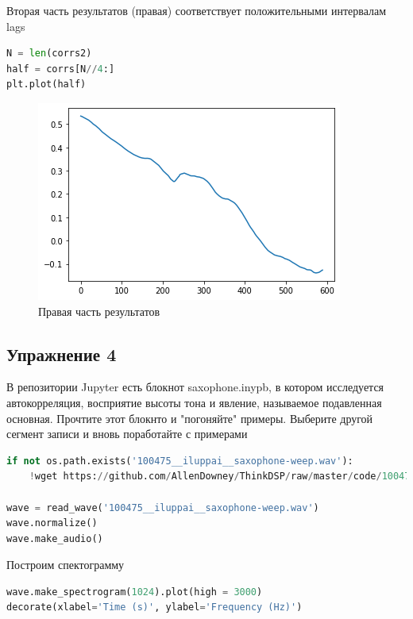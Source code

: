 Вторая часть результатов (правая) соответствует положительными интервалам lags

\begin{lstlisting}[language=Python]
N = len(corrs2)
half = corrs[N//4:]
plt.plot(half)
\end{lstlisting}

\begin{figure}[H]
	\begin{center}
		\includegraphics[scale=1]{fig/lab05/lab05_09.png}
		\caption{Правая часть результатов}
	\end{center}
\end{figure}


\subsection{Упражнение 4}

В репозитории Jupyter есть блокнот saxophone.inypb, в котором исследуется автокорреляция, восприятие высоты тона и явление, называемое подавленная основная. Прочтите этот блокнто и "погоняйте" примеры. Выберите другой сегмент записи и вновь поработайте с примерами

\begin{lstlisting}[language=Python]
if not os.path.exists('100475__iluppai__saxophone-weep.wav'):
    !wget https://github.com/AllenDowney/ThinkDSP/raw/master/code/100475__iluppai__saxophone-weep.wav
    
wave = read_wave('100475__iluppai__saxophone-weep.wav')
wave.normalize()
wave.make_audio()
\end{lstlisting}

Построим спектограмму

\begin{lstlisting}[language=Python]
wave.make_spectrogram(1024).plot(high = 3000)
decorate(xlabel='Time (s)', ylabel='Frequency (Hz)')
\end{lstlisting}

